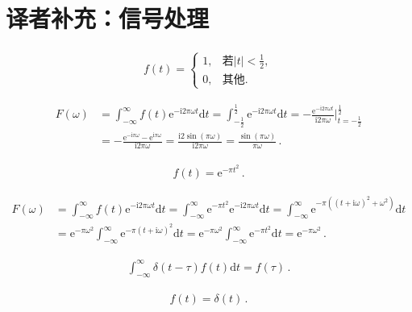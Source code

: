 \section{译者补充：信号处理}\label{sec:译者补充：信号处理}
\begin{align}
    f(t)=\left\{\begin{array}{ll}
        1, & \displaystyle\text{若}|t|<\frac{1}{2}, \\
        0, & \text{其他}.
    \end{array}\right.
\end{align}

\begin{align}
    F(\omega) & =\int_{-\infty}^{\infty}f(t)\mathrm{e}^{-\mathrm{i}2\pi\omega t}\mathrm{d}t
    =\int_{-\frac{1}{2}}^{\frac{1}{2}}\mathrm{e}^{-\mathrm{i}2\pi\omega t}\mathrm{d}t
    =-\frac{\mathrm{e}^{-\mathrm{i}2\pi\omega t}}{\mathrm{i}2\pi\omega}\bigg|_{t=-\frac{1}{2}}^{\frac{1}{2}}\nonumber \\
              & =-\frac{\mathrm{e}^{-\mathrm{i}\pi\omega}-\mathrm{e}^{\mathrm{i}\pi\omega}}{\mathrm{i}2\pi\omega}
    =\frac{\mathrm{i}2\sin(\pi\omega)}{\mathrm{i}2\pi\omega}
    =\frac{\sin(\pi\omega)}{\pi\omega}\, .
\end{align}

\begin{align}
    f(t)=\mathrm{e}^{-\pi t^2}\, .
\end{align}

\begin{align}
    F(\omega) & =\int_{-\infty}^{\infty}f(t)\mathrm{e}^{-\mathrm{i}2\pi\omega t}\mathrm{d}t
    =\int_{-\infty}^{\infty}\mathrm{e}^{-\pi t^2}\mathrm{e}^{-\mathrm{i}2\pi\omega t}\mathrm{d}t
    =\int_{-\infty}^{\infty}\mathrm{e}^{-\pi((t+\mathrm{i}\omega)^2+\omega^2)}\mathrm{d}t\nonumber                  \\
              & =\mathrm{e}^{-\pi\omega^2}\int_{-\infty}^{\infty}\mathrm{e}^{-\pi(t+\mathrm{i}\omega)^2}\mathrm{d}t
    =\mathrm{e}^{-\pi\omega^2}\int_{-\infty}^{\infty}\mathrm{e}^{-\pi t^2}\mathrm{d}t
    =\mathrm{e}^{-\pi\omega^2}\, .
\end{align}

\begin{align}
    \int_{-\infty}^{\infty}\delta(t-\tau)f(t)\mathrm{d}t=f(\tau)\, .
\end{align}

\begin{align}
    f(t)=\delta(t)\, .
\end{align}

